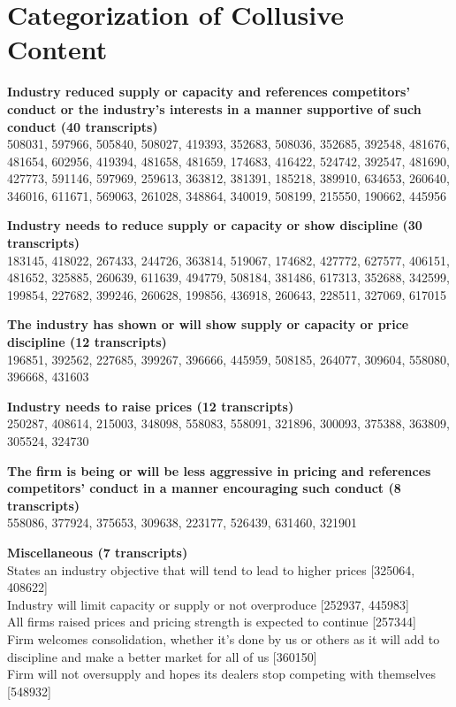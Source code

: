 \section{Categorization of Collusive Content}\label{sec:si_categorization_collusive_content}

\textbf{Industry reduced supply or capacity and references competitors' conduct or the industry's interests in a manner supportive of such conduct (40 transcripts)} \\
508031, 597966, 505840, 508027, 419393, 352683, 508036, 352685, 392548, 481676, 481654, 602956, 419394, 481658, 481659, 174683, 416422, 524742, 392547, 481690, 427773, 591146, 597969, 259613, 363812, 381391, 185218, 389910, 634653, 260640, 346016, 611671, 569063, 261028, 348864, 340019, 508199, 215550, 190662, 445956

\textbf{Industry needs to reduce supply or capacity or show discipline (30 transcripts)} \\
183145, 418022, 267433, 244726, 363814, 519067, 174682, 427772, 627577, 406151, 481652, 325885, 260639, 611639, 494779, 508184, 381486, 617313, 352688, 342599, 199854, 227682, 399246, 260628, 199856, 436918, 260643, 228511, 327069, 617015

\textbf{The industry has shown or will show supply or capacity or price discipline (12 transcripts)} \\
196851, 392562, 227685, 399267, 396666, 445959, 508185, 264077, 309604, 558080, 396668, 431603

\textbf{Industry needs to raise prices (12 transcripts)} \\
250287, 408614, 215003, 348098, 558083, 558091, 321896, 300093, 375388, 363809, 305524, 324730

\textbf{The firm is being or will be less aggressive in pricing and references competitors' conduct in a manner encouraging such conduct (8 transcripts)} \\
558086, 377924, 375653, 309638, 223177, 526439, 631460, 321901

\textbf{Miscellaneous (7 transcripts)} \\
States an industry objective that will tend to lead to higher prices [325064, 408622] \\
Industry will limit capacity or supply or not overproduce [252937, 445983] \\
All firms raised prices and pricing strength is expected to continue [257344] \\
Firm welcomes consolidation, whether it's done by us or others as it will add to discipline and make a better market for all of us [360150] \\
Firm will not oversupply and hopes its dealers stop competing with themselves [548932]
